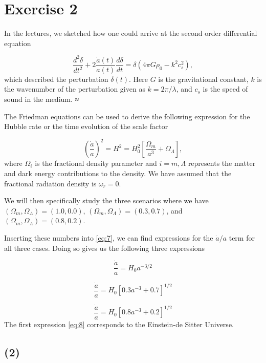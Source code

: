\documentclass[a4paper]{article}
\begin{document}
\section*{Exercise 2}
In the lectures, we sketched how one could arrive at the second order differential equation 

\begin{equation}
\frac{d^2 \delta}{dt^2} + 2 \frac{\dot{a}(t)}{a(t)} \frac{d \delta}{dt} = \delta(4 \pi G \rho_0 - k^2 c_s^2),
\end{equation}
which described the perturbation $\delta(t)$. Here $G$ is the gravitational constant, $k$ is the wavenumber of the perturbation given as $k = 2\pi/ \lambda$, and $c_s$ is the speed of sound in the medium.
≈

The Friedman equations can be used to derive the following expression for the Hubble rate or the time evolution of the scale factor 

\begin{equation}
\left(\frac{\dot{a}}{a}\right)^2 = H^2 = H_0^2 \left[ \frac{\Omega_m}{a^3} +  \Omega_\Lambda \right],
\end{equation}
where $\Omega_i$ is the fractional density parameter and
$i = m, \Lambda$ represents the matter and dark energy contributions to the density. We have assumed that the fractional radiation density is $\omega_r = 0$. 

We will then specifically study the three scenarios where we have  $(\Omega_m, \Omega_\Lambda) = (1.0, 0.0)$, $(\Omega_m, \Omega_\Lambda) = (0.3, 0.7)$, and $(\Omega_m, \Omega_\Lambda) = (0.8, 0.2)$. 

Inserting these numbers into \eqref{eq:7}, we can find expressions for the $\dot{a}/a$ term for all three cases. Doing so gives us the following three expressions

\begin{equation}
\frac{\dot{a}}{a} = H_0 a^{-3/2}
\end{equation}

\begin{equation}
\frac{\dot{a}}{a} = H_0 \left[0.3a^{-3} + 0.7\right]^{1/2}
\end{equation}

\begin{equation}
\frac{\dot{a}}{a} = H_0  \left[0.8a^{-3} + 0.2\right]^{1/2}
\end{equation}
The first expression \eqref{eq:8} corresponds to the Einstein-de Sitter Universe.

\subsection*{(2)}
\end{document}
